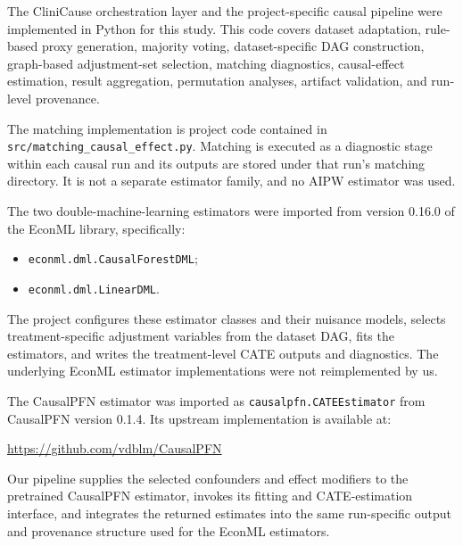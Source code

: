\documentclass[letterpaper,10pt]{article}
\begin{document}
The CliniCause orchestration layer and the project-specific causal pipeline were
implemented in Python for this study. This code covers dataset
adaptation, rule-based proxy generation, majority voting, dataset-specific DAG
construction, graph-based adjustment-set selection, matching diagnostics,
causal-effect estimation, result aggregation, permutation analyses, artifact
validation, and run-level provenance.

The matching implementation is project code contained in
\texttt{src/matching\_causal\_effect.py}. Matching is executed as a diagnostic
stage within each causal run and its outputs are stored under that run's
matching directory. It is not a separate estimator family, and no AIPW
estimator was used.

The two double-machine-learning estimators were imported from version 0.16.0 of
the EconML library, specifically:

\begin{itemize}
    \item \texttt{econml.dml.CausalForestDML};
    \item \texttt{econml.dml.LinearDML}.
\end{itemize}

The project configures these estimator classes and their nuisance models,
selects treatment-specific adjustment variables from the dataset DAG, fits the
estimators, and writes the treatment-level CATE outputs and diagnostics. The
underlying EconML estimator implementations were not reimplemented by us.

The CausalPFN estimator was imported as
\texttt{causalpfn.CATEEstimator} from CausalPFN version 0.1.4. Its upstream
implementation is available at:

\begin{center}
\url{https://github.com/vdblm/CausalPFN}
\end{center}

Our pipeline supplies the selected confounders and effect modifiers to the
pretrained CausalPFN estimator, invokes its fitting and CATE-estimation
interface, and integrates the returned estimates into the same run-specific
output and provenance structure used for the EconML estimators.




\end{document}
